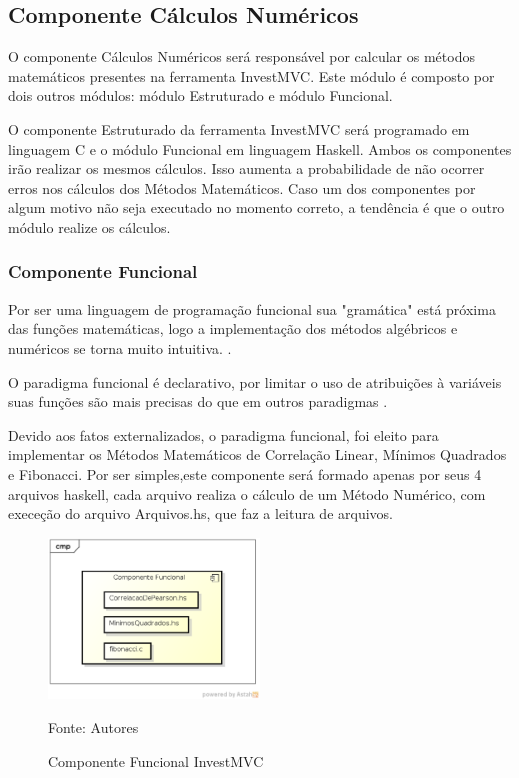 \subsection{Componente Cálculos Numéricos}

O componente Cálculos Numéricos será responsável por calcular os métodos matemáticos presentes na ferramenta InvestMVC. Este módulo é composto por dois outros módulos: módulo Estruturado e módulo Funcional.

O componente Estruturado da ferramenta InvestMVC será programado em linguagem C e o módulo Funcional em linguagem Haskell. Ambos os componentes irão realizar os mesmos cálculos. Isso aumenta a probabilidade de não ocorrer erros nos cálculos dos Métodos Matemáticos. Caso um dos componentes por algum motivo não seja executado no momento correto, a tendência é que o outro módulo realize os cálculos.

\subsubsection{Componente Funcional}
Por ser uma linguagem de programação funcional sua "gramática" está próxima das funções matemáticas, logo a implementação dos métodos algébricos e numéricos se torna muito intuitiva. \cite{hoogle2013}.

O paradigma funcional é declarativo, por limitar o uso de atribuições à variáveis suas funções são mais precisas do que em outros paradigmas \cite{piponi2006}.

Devido aos fatos externalizados, o paradigma funcional, foi eleito para implementar os Métodos Matemáticos de Correlação Linear, Mínimos Quadrados e Fibonacci. Por ser simples,este componente será formado apenas por seus 4 arquivos haskell, cada arquivo realiza o cálculo de um Método Numérico, com execeção do arquivo  Arquivos.hs, que faz a leitura de arquivos.

\begin{figure}[htp]
\centering
\includegraphics[width=0.5\textwidth]{figuras/componenteFuncional}
\caption{Componente Funcional InvestMVC}{Fonte: Autores} 
\label{componenteFuncional}
\end{figure}

